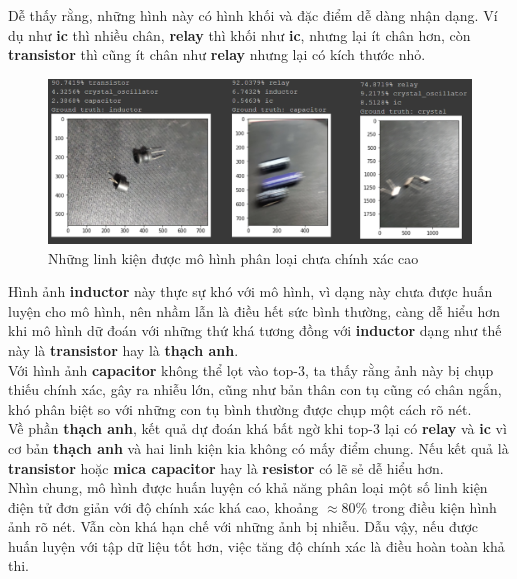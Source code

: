 \documentclass[a4paper]{article}
\begin{document}
\noindent
Dễ thấy rằng, những hình này có hình khối và đặc điểm dễ dàng nhận dạng. Ví dụ như \textbf{ic} thì nhiều chân, \textbf{relay} thì khối như \textbf{ic}, nhưng lại ít chân hơn, còn \textbf{transistor} thì cũng ít chân như \textbf{relay} nhưng lại có kích thước nhỏ.
\begin{figure}[h!]
\centering
\includegraphics[width=15cm]{images/result2.PNG}
\caption*{Những linh kiện được mô hình phân loại chưa chính xác cao}
\end{figure}

\noindent
Hình ảnh \textbf{inductor} này thực sự khó với mô hình, vì dạng này chưa được huấn luyện cho mô hình, nên nhầm lẫn là điều hết sức bình thường, càng dễ hiểu hơn khi mô hình dữ đoán với những thứ khá tương đồng với \textbf{inductor} dạng như thế này là \textbf{transistor} hay là \textbf{thạch anh}.\\
Với hình ảnh \textbf{capacitor} không thể lọt vào top-3, ta thấy rằng ảnh này bị chụp thiếu chính xác, gây ra nhiễu lớn, cũng như bản thân con tụ cũng có chân ngắn, khó phân biệt so với những con tụ bình thường được chụp một cách rõ nét.\\
Về phần \textbf{thạch anh}, kết quả dự đoán khá bất ngờ khi top-3 lại có \textbf{relay} và \textbf{ic} vì cơ bản \textbf{thạch anh} và hai linh kiện kia không có mấy điểm chung. Nếu kết quả là \textbf{transistor} hoặc \textbf{mica capacitor} hay là \textbf{resistor} có lẽ sẻ dễ hiểu hơn.\\

\noindent
Nhìn chung, mô hình được huấn luyện có khả năng phân loại một số linh kiện điện tử đơn giản với độ chính xác khá cao, khoảng $\approx 80\%$ trong điều kiện hình ảnh rõ nét. Vẫn còn khá hạn chế với những ảnh bị nhiễu. Dẫu vậy, nếu được huấn luyện với tập dữ liệu tốt hơn, việc tăng độ chính xác là điều hoàn toàn khả thi.
\newpage
\end{document}
